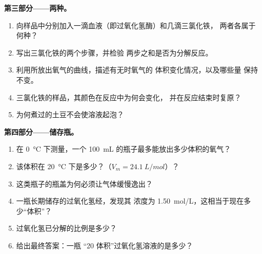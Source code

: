 \begin{problem}
\medskip
\noindent\textbf{第三部分——两种。}
\begin{enumerate}[resume]
  \item 向样品中分别加入一滴血液（即过氧化氢酶）和几滴三氯化铁，
        两者各属于何种？
  \item 写出三氯化铁的两个步骤，并检验
        两步之和是否为分解反应。
  \item 利用所放出氧气的曲线，描述有无时氧气的
        体积变化情况，以及哪些量
        保持不变。
  \item 三氯化铁的样品，其颜色在反应中为何会变化，
        并在反应结束时复原？
  \item 为何煮过的土豆不会使溶液起泡？
\end{enumerate}

\medskip
\noindent\textbf{第四部分——储存瓶。}
\begin{enumerate}[resume]
  \item 在 \qty{0}{\celsius} 下测量，一个
        \qty{100}{mL} 的瓶子最多能放出多少体积的氧气？
  \item 该体积在 \qty{20}{\celsius} 下是多少？（$V_m =
        \qty{24.1}{L/mol}$）？
  \item 这类瓶子的瓶盖为何必须让气体缓慢逸出？
  \item 一瓶长期储存的过氧化氢经，发现其
        浓度为 \qty{1.50}{mol/L}，这相当于现在多少“体积”？
  \item 过氧化氢已分解的比例是多少？
  \item 给出最终答案：一瓶
        “20 体积”过氧化氢溶液的是多少？
\end{enumerate}
\end{problem}
